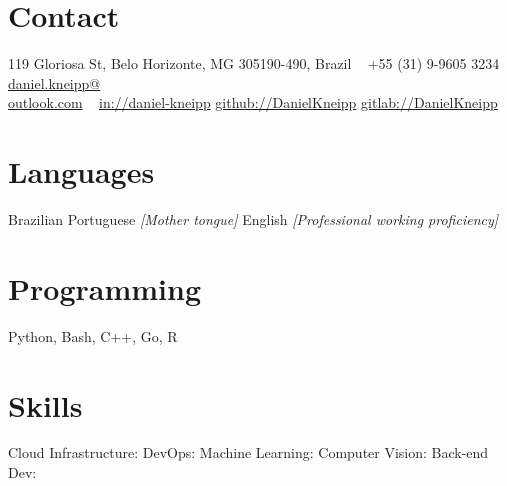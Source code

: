 \documentclass[a4paper]{cv-friggeri-x}
\begin{document}


\begin{aside} %
\section{Contact}
\pin \hfill 119 Gloriosa St,
Belo Horizonte, MG
305190-490, Brazil
~
{\Large\textcolor{gray}{\Mobilefone}} \hfill +55 (31) 9-9605 3234
{\Large\textcolor{gray}{\Letter}} \hfill \href{mailto:daniel.kneipp@outlook.com}{daniel.kneipp@\\outlook.com}
~
\llogo \hfill \href{https://www.linkedin.com/in/daniel-kneipp/}{in://daniel-kneipp}
\githublogo \hfill \href{https://github.com/DanielKneipp}{github://DanielKneipp}
\gitlablogo \hfill \href{https://gitlab.com/DanielKneipp}{gitlab://DanielKneipp}
\section{Languages}
Brazilian Portuguese \hspace{5mm}\null
\textit{\footnotesize{[Mother tongue]}}
English  \hspace{5mm}\null
\textit{\footnotesize{[Professional working proficiency]}}
\section{Programming}
Python, Bash,
C++, Go, R
\section{Skills}
Cloud Infrastructure: \hspace{5mm}\null
{}
DevOps:               \hspace{5mm}\null
{}
Machine Learning:     \hspace{5mm}\null
{}
Computer Vision:      \hspace{5mm}\null
{}
Back-end Dev:         \hspace{5mm}\null
{}
\end{aside}
\end{document}
